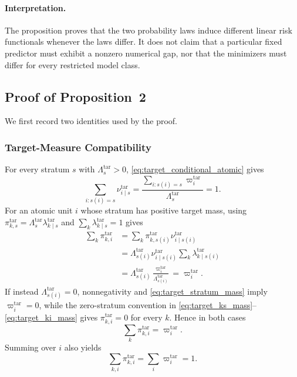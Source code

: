 \documentclass[letterpaper,journal]{IEEEtran}
\begin{document}
\paragraph{Interpretation.}
The proposition proves that the two probability laws induce different linear
risk functionals whenever the laws differ.  It does not claim that a particular
fixed predictor must exhibit a nonzero numerical gap, nor that the minimizers
must differ for every restricted model class.


\subsection{Proof of Proposition~2}
\label{app:proof_prop2}

We first record two identities used by the proof.

\subsubsection{Target-Measure Compatibility}

For every stratum $s$ with $\Lambda_s^{\mathrm{tar}}>0$,
\eqref{eq:target_conditional_atomic} gives
\begin{equation}
    \sum_{i:s(i)=s}
    \nu^{\mathrm{tar}}_{i\mid s}
    =
    \frac{
    \sum_{i:s(i)=s}\varpi_i^{\mathrm{tar}}
    }{
    \Lambda_s^{\mathrm{tar}}
    }
    =1.
    \label{eq:app_nu_normalization}
\end{equation}
For an atomic unit $i$ whose stratum has positive target mass, using
$\pi^{\mathrm{tar}}_{k,s}
=\Lambda_s^{\mathrm{tar}}
\lambda^{\mathrm{tar}}_{k\mid s}$ and
$\sum_k\lambda^{\mathrm{tar}}_{k\mid s}=1$ gives
\begin{align}
 \sum_k\pi^{\mathrm{tar}}_{k,i}
 &=
 \sum_k
 \pi^{\mathrm{tar}}_{k,s(i)}
 \nu^{\mathrm{tar}}_{i\mid s(i)}
 \nonumber\\
 &=
 \Lambda_{s(i)}^{\mathrm{tar}}
 \nu^{\mathrm{tar}}_{i\mid s(i)}
 \sum_k
 \lambda^{\mathrm{tar}}_{k\mid s(i)}
 \nonumber\\
 &=
 \Lambda_{s(i)}^{\mathrm{tar}}
 \frac{\varpi_i^{\mathrm{tar}}}
 {\Lambda_{s(i)}^{\mathrm{tar}}}
 =
 \varpi_i^{\mathrm{tar}}.
 \label{eq:app_target_compatibility_positive}
\end{align}
If instead $\Lambda_{s(i)}^{\mathrm{tar}}=0$, nonnegativity and
\eqref{eq:target_stratum_mass} imply $\varpi_i^{\mathrm{tar}}=0$, while the
zero-stratum convention in \eqref{eq:target_ks_mass}--\eqref{eq:target_ki_mass}
gives $\pi^{\mathrm{tar}}_{k,i}=0$ for every $k$.  Hence in both cases
\begin{equation}
 \sum_k\pi^{\mathrm{tar}}_{k,i}
 =\varpi_i^{\mathrm{tar}}.
 \label{eq:app_target_compatibility}
\end{equation}
Summing over $i$ also yields
\begin{equation}
    \sum_{k,i}\pi^{\mathrm{tar}}_{k,i}
    =
    \sum_i\varpi_i^{\mathrm{tar}}
    =1.
    \label{eq:app_pi_normalized}
\end{equation}
\end{document}
